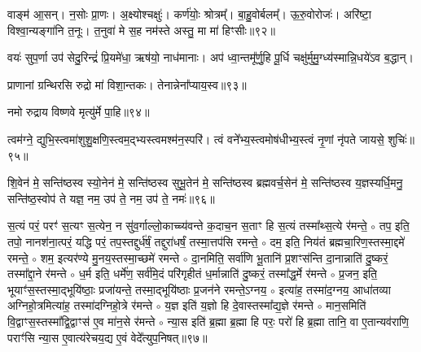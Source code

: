 वाङ्म॑ आ॒सन्। 
न॒सोः प्रा॒णः। 
अ॒क्ष्योश्चक्षुः॑। 
कर्ण॑योः॒ श्रोत्रम्᳚। 
बा॒हु॒वोर्बलम्᳚। 
ऊ॒रु॒वोरोजः॑। 
अरि॑ष्टा॒ विश्वा॒न्यङ्गा॑नि त॒नूः। 
त॒नुवा॑ मे स॒ह नम॑स्ते अस्तु॒ मा मा॑ हिꣳसीः॥९२॥\anuvakamend

वयः॑ सुप॒र्णा उप॑ सेदु॒रिन्द्रं॑ प्रि॒यमे॑धा॒ ऋष॑यो॒ नाध॑मानाः। 
अप॑ ध्वा॒न्तमू᳚र्णु॒हि पू॒र्धि चक्षु॑र्मुमु॒ग्ध्य॑स्मान्नि॒धये॑ऽव ब॒द्धान्।\anuvakamend

प्राणानां ग्रन्थिरसि रुद्रो मा॑ विशा॒न्तकः। 
तेनान्नेना᳚प्या\-य॒स्व॥९३॥\anuvakamend

नमो रुद्राय विष्णवे मृत्यु॑र्मे पा॒हि॥९४॥\anuvakamend


त्वम॑ग्ने॒ द्युभि॒स्त्वमा॑शुशु॒क्षणि॒स्त्वम॒द्भ्यस्त्वमश्म॑न॒स्परि॑। 
त्वं वने᳚भ्य॒स्त्वमोष॑धीभ्य॒स्त्वं नृ॒णां नृ॑पते जायसे॒ शुचिः॑॥९५॥\anuvakamend

शि॒वेन॑ मे॒ सन्ति॑ष्ठस्व स्यो॒नेन॑  मे॒ सन्ति॑ष्ठस्व सुभू॒तेन॑  मे॒ सन्ति॑ष्ठस्व ब्रह्मवर्च॒सेन॑  मे॒ सन्ति॑ष्ठस्व य॒ज्ञस्यर्धि॒मनु॒ सन्ति॑ष्ठ॒स्वोप॑ ते यज्ञ॒ नम॒ उप॑ ते॒ नम॒ उप॑ ते॒ नमः॑॥९६॥\anuvakamend

\newcommand{\sep}{{\small$\circ$} }
स॒त्यं परं॒ परꣳ॑ स॒त्यꣳ स॒त्येन॒ न सु॑व॒र्गाल्लो॒काच्च्य॑वन्ते क॒दाच॒न स॒ताꣳ हि स॒त्यं तस्मा᳚थ्स॒त्ये र॑मन्ते॒ \sep
तप॒ इति॒ तपो॒ नानश॑ना॒त्परं॒ यद्धि परं॒ तप॒स्तद्दुर्ध॑र्\mbox{}षं॒ तद्दुरा॑धर्\mbox{}षं॒ तस्मा॒त्तप॑सि रमन्ते॒ \sep
दम॒ इति॒ निय॑तं ब्रह्मचा॒रिण॒स्तस्मा॒द्दमे॑ रमन्ते॒ \sep
शम॒ इत्यर॑ण्ये मु॒नय॒स्तस्मा॒च्छमे॑ रमन्ते \sep
दा॒नमिति॒ सर्वा॑णि भू॒तानि॑ प्र॒शꣳस॑न्ति दा॒नान्नाति॑ दु॒ष्करं॒ तस्मा᳚द्दा॒ने र॑मन्ते \sep
ध॒र्म इति॒ धर्मे॑ण॒ सर्व॑मि॒दं परि॑गृहीतं ध॒र्मान्नाति॑ दु॒ष्करं॒ तस्मा᳚द्ध॒र्मे र॑मन्ते \sep
प्र॒जन॒ इति॒ भूयाꣳ॑स॒स्तस्मा॒द्भूयि॑ष्ठाः॒ प्रजा॑यन्ते॒ तस्मा॒द्भूयि॑ष्ठाः प्र॒जन॑ने रमन्ते॒ऽग्नय॒ \sep
इत्या॑ह॒ तस्मा॑द॒ग्नय॒ आधा॑तव्या अग्निहो॒त्रमित्या॑ह॒ तस्मा॑दग्निहो॒त्रे र॑मन्ते \sep
य॒ज्ञ इति॑ य॒ज्ञो हि दे॒वास्तस्मा᳚द्य॒ज्ञे र॑मन्ते \sep
मान॒समिति॑ वि॒द्वाꣳस॒स्तस्मा᳚द्वि॒द्वाꣳस॑ ए॒व मा॑न॒से र॑मन्ते \sep
न्या॒स इति॑ ब्र॒ह्मा ब्र॒ह्मा हि परः॒ परो॑ हि ब्र॒ह्मा तानि॒ वा ए॒तान्यव॑राणि॒ पराꣳ॑सि न्या॒स ए॒वात्य॑रेचय॒द्य ए॒वं वेदे᳚त्युप॒निषत्॥९७॥
\anuvakamend


